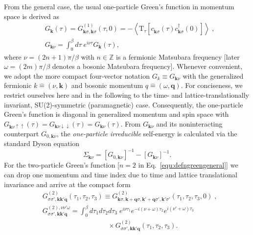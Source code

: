 \documentclass[rmp,aps,reprint,amsmath,amssymb,superscriptaddress,showpacs,nofootinbib]{revtex4-1}
\begin{document}
From the general case, the usual one-particle Green's function in momentum space is derived as
\begin{align}
 \label{equ:def1pgf}
 &G_{\mathbf{k}}(\tau)={G}^{(1)}_{\mathbf{k}\sigma,\mathbf{k}\sigma}(\tau,0) = - \left\langle \mbox{T}_\tau \left[c^{\phantom{\dagger}}_{\mathbf{k}\sigma}(\tau)c^\dagger_{\mathbf{k}\sigma}(0)\right]\right\rangle\nonumber \; ,\\
 &G_{\mathbf{k}\nu}=\int_0^{\beta}d\tau\;e^{i\nu\tau}G_{\mathbf{k}}(\tau),
\end{align}
where $\nu=(2n+1)\pi/\beta$ with $n\in\mathds{Z}$ is a fermionic Matsubara frequency [later $\omega=(2m)\pi/\beta$ denotes a bosonic Matsubara frequency]. Whenever convenient, we adopt the more compact four-vector notation $ G_k\equiv G_{\mathbf{k}\nu}$ with the generalized fermionic $k\widehat{=}(\nu,\mathbf{k})$ and bosonic  momentum $q\widehat{=}(\omega,\mathbf{q})$. For conciseness, we restrict ourselves here and in the following to the time- and lattice-translationally invariant, SU(2)-symmetric (paramagnetic) case. Consequently, the one-particle Green's function is diagonal in generalized momentum and spin space with $G_{\mathbf{k}\nu\uparrow\uparrow}(\tau)= G_{\mathbf{k}\nu\downarrow\downarrow}(\tau)= G_{\mathbf{k}\nu}(\tau)$. From $G_{\mathbf{k}\nu}$ and its noninteracting counterpart $G_{0,\mathbf{k}\nu}$, the {\sl one-particle irreducible} self-energy is calculated via the standard Dyson equation 
\begin{equation}
\Sigma_{\mathbf{k}\nu}\!=[G_{0,\mathbf{k}\nu}]^{-1}\!-\![G_{\mathbf{k}\nu}]^{-1} .
\label{Eq:Dyson}
\end{equation}
For the two-particle Green's function [$n\!=\!2$ in Eq.~\eqref{equ:defngreengeneral}] we can drop one momentum and time index due to time and lattice translational invariance and arrive at the compact form
\begin{align}
 \label{equ:def2pgf}
 &G^{(2)}_{\sigma\sigma',\mathbf{k}\mathbf{k'}\mathbf{q}}(\tau_1,\tau_2,\tau_3)\equiv G^{(2)}_{\mathbf{k}\sigma,\mathbf{k}+\mathbf{q}\sigma,\mathbf{k'}+\mathbf{q}\sigma',\mathbf{k'}\sigma'}(\tau_1,\tau_2,\tau_3,0)\nonumber \; ,\\
&G_{\sigma\sigma',\mathbf{k}\mathbf{k'}\mathbf{q}}^{(2),\nu\nu'\omega}=\int_0^{\beta}d\tau_1d\tau_2d\tau_3\;e^{i\nu\tau_1}e^{-i(\nu+\omega)\tau_2}e^{i(\nu'+\omega)\tau_3}\nonumber\\&\hspace{4cm}\times G^{(2)}_{\sigma\sigma',\mathbf{k}\mathbf{k'}\mathbf{q}}(\tau_1,\tau_2,\tau_3).
\end{align}
\end{document}
